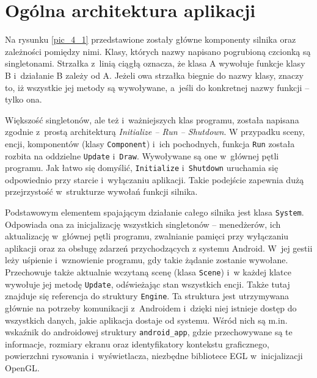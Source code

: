 	\section{Ogólna architektura aplikacji}
	\label{t:praktyka:ogolne}
	
	
	
	Na rysunku \ref{pic_4_1} przedstawione zostały główne komponenty silnika oraz zależności pomiędzy nimi. Klasy, których nazwy napisano pogrubioną czcionką są singletonami. Strzałka z~linią ciągłą oznacza, że klasa A wywołuje funkcje klasy B i~działanie B zależy od A. Jeżeli owa strzałka biegnie do nazwy klasy, znaczy to, iż wszystkie jej metody są wywoływane, a~jeśli do konkretnej nazwy funkcji -- tylko ona.
	
	Większość singletonów, ale też i~ważniejszych klas programu, została napisana zgodnie z~prostą architekturą \emph{Initialize -- Run -- Shutdown}. W przypadku sceny, encji, komponentów (klasy \texttt{Component}) i~ich pochodnych, funkcja \texttt{Run} została rozbita na oddzielne \texttt{Update} i~\texttt{Draw}. Wywoływane są one w~głównej pętli programu. Jak łatwo się domyślić, \texttt{Initialize} i~\texttt{Shutdown} uruchamia się odpowiednio przy starcie i~wyłączaniu aplikacji. Takie podejście zapewnia dużą przejrzystość w~strukturze wywołań funkcji silnika.
	
	Podstawowym elementem spajającym działanie całego silnika jest klasa \texttt{System}. Odpowiada ona za inicjalizację wszystkich singletonów -- menedżerów, ich aktualizację w~głównej pętli programu, zwalnianie pamięci przy wyłączaniu aplikacji oraz za obsługę zdarzeń przychodzących z systemu Android. W~jej gestii leży uśpienie i~wznowienie programu, gdy takie żądanie zostanie wywołane. Przechowuje także aktualnie wczytaną scenę (klasa \texttt{Scene}) i~w każdej klatce wywołuje jej metodę \texttt{Update}, odświeżając stan wszystkich encji. Także tutaj znajduje się referencja do struktury \texttt{Engine}. Ta struktura jest utrzymywana głównie na potrzeby komunikacji z~Androidem i~dzięki niej istnieje dostęp do wszystkich danych, jakie aplikacja dostaje od systemu. Wśród nich są m.in. wskaźnik do androidowej struktury \texttt{android\_app}, gdzie przechowywane są te informacje, rozmiary ekranu oraz identyfikatory kontekstu graficznego, powierzchni rysowania i~wyświetlacza, niezbędne bibliotece EGL w~inicjalizacji OpenGL.
	
